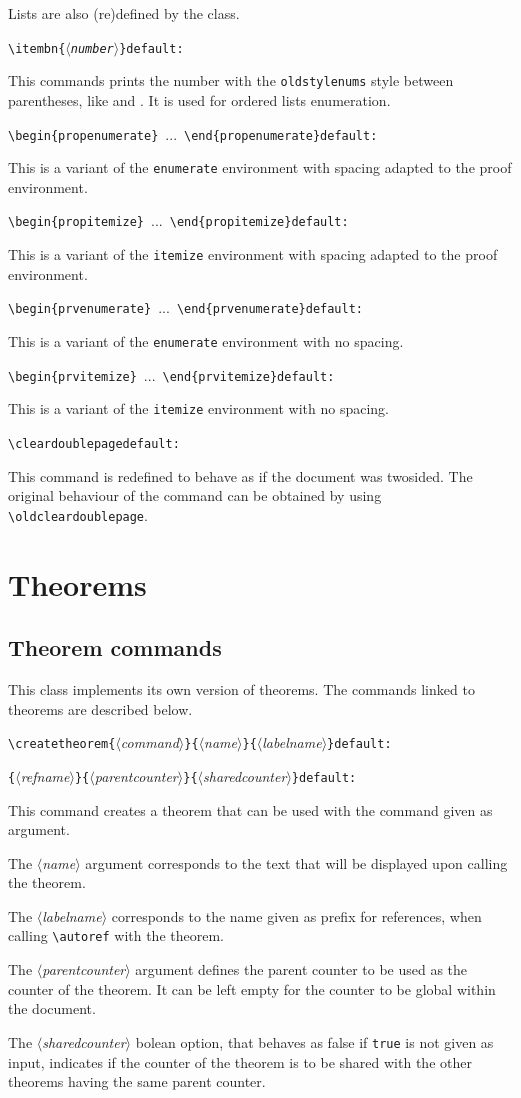 \documentclass[12pt, babellanguage=british, titlespace, defaulttheorems]{altarticle}
\newcommand{\aargt}[1]{\ensuremath{\langle}\textrm{{\emph{#1}}}\ensuremath{\rangle}}
\newcommand{\argt}[1]{\texttt{\{}\ensuremath{\langle}\textrm{{\emph{#1}}}\ensuremath{\rangle}\texttt{\}}}
\newcommand{\commandline}[1][]{\def\argI{#1}\ccommandline}
\newcommand{\ccommandline}[2][]{\par\medskip\hspace*{-.75cm}\texttt{\textbackslash#2}\argI{}\hfill\if\relax\detokenize{#1}\relax\else\texttt{default:~#1}\fi\par}
\newcommand{\pcommandline}[1][]{\def\argI{#1}\pccommandline}
\newcommand{\pccommandline}[2][]{\par\hspace*{-.75cm}\hphantom{\texttt{\textbackslash#2}}\argI{}\hfill\if\relax\detokenize{#1}\relax\else\texttt{default:~#1}\fi\par}
\newcommand{\envline}[1][]{\def\argI{#1}\eenvline}
\newcommand{\eenvline}[2][]{\par\medskip\hspace*{-.75cm}\texttt{\textbackslash begin\{#2\}}\argI{}~...~\texttt{\textbackslash end\{#2\}}\hfill\if\relax\detokenize{#1}\relax\else\texttt{default:~#1}\fi\par}
\begin{document}
\null

Lists are also (re)defined by the class.
\commandline[]{itembn\argt{number}}This commands prints the number with the \texttt{oldstylenums} style between parentheses, like  and . It is used for ordered lists enumeration.
\envline{propenumerate}This is a variant of the \texttt{enumerate} environment with spacing adapted to the proof environment.
\envline{propitemize}This is a variant of the \texttt{itemize} environment with spacing adapted to the proof environment.
\envline{prvenumerate}This is a variant of the \texttt{enumerate} environment with no spacing.
\envline{prvitemize}This is a variant of the \texttt{itemize} environment with no spacing.

\null

\commandline{cleardoublepage}This command is redefined to behave as if the document was twosided. The original behaviour of the command can be obtained by using \texttt{\textbackslash oldcleardoublepage}.
\section{Theorems}
\subsection{Theorem commands}
This class implements its own version of theorems. The commands linked to theorems are described below.
\commandline[\argt{command}\argt{name}\argt{labelname}]{createtheorem}
\pcommandline[\argt{refname}\argt{parentcounter}\argt{sharedcounter}]{createtheorem}This command creates a theorem that can be used with the command given as argument.

The \aargt{name} argument corresponds to the text that will be displayed upon calling the theorem.

The \aargt{labelname} corresponds to the name given as prefix for references, when calling \texttt{\textbackslash autoref} with the theorem.

The \aargt{parentcounter} argument defines the parent counter to be used as the counter of the theorem. It can be left empty for the counter to be global within the document.

The \aargt{sharedcounter} bolean option, that behaves as false if \texttt{true} is not given as input, indicates if the counter of the theorem is to be shared with the other theorems having the same parent counter.
\end{document}
